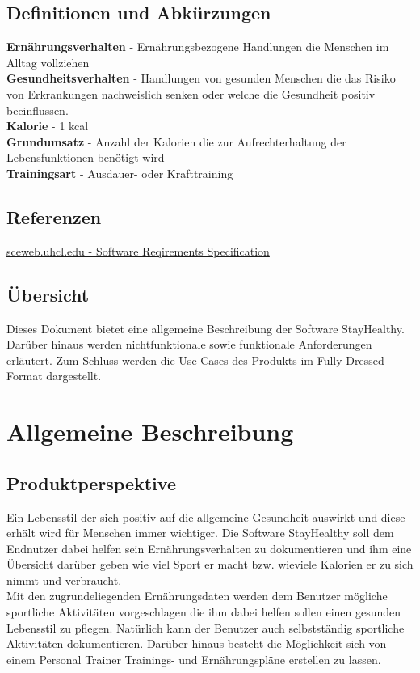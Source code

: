 \documentclass[12pt,a4paper,onecolumn]{article}
\begin{document}
\subsection{Definitionen und Abkürzungen}
\textbf{Ernährungsverhalten} - Ernährungsbezogene Handlungen die Menschen im Alltag vollziehen\\
\textbf{Gesundheitsverhalten} - Handlungen von gesunden Menschen die das Risiko von Erkrankungen nachweislich senken oder welche die Gesundheit positiv beeinflussen.\\
\textbf{Kalorie} - 1 kcal\\
\textbf{Grundumsatz} - Anzahl der Kalorien die zur Aufrechterhaltung der Lebensfunktionen benötigt wird\\
\textbf{Trainingsart} - Ausdauer- oder Krafttraining
\subsection{Referenzen}
\href{https://sceweb.uhcl.edu/helm/RationalUnifiedProcess/webtmpl/templates/req/rup_srs.htm}{sceweb.uhcl.edu - Software Reqirements Specification}
\subsection{Übersicht}
Dieses Dokument bietet eine allgemeine Beschreibung der Software StayHealthy. Darüber hinaus werden nichtfunktionale sowie funktionale Anforderungen erläutert. Zum Schluss werden die Use Cases des Produkts im Fully Dressed Format dargestellt.

\section{Allgemeine Beschreibung}
\subsection{Produktperspektive}
Ein Lebensstil der sich positiv auf die allgemeine Gesundheit auswirkt und diese erhält wird für Menschen immer wichtiger. Die Software StayHealthy soll dem Endnutzer dabei helfen sein Ernährungsverhalten zu dokumentieren und ihm eine Übersicht darüber geben wie viel Sport er macht bzw. wieviele Kalorien er zu sich nimmt und verbraucht.\\ Mit den zugrundeliegenden Ernährungsdaten werden dem Benutzer mögliche sportliche Aktivitäten vorgeschlagen die ihm dabei helfen sollen einen gesunden Lebensstil zu pflegen. Natürlich kann der Benutzer auch selbstständig sportliche Aktivitäten dokumentieren. Darüber hinaus besteht die Möglichkeit sich von einem Personal Trainer Trainings- und Ernährungspläne erstellen zu lassen.
\end{document}
